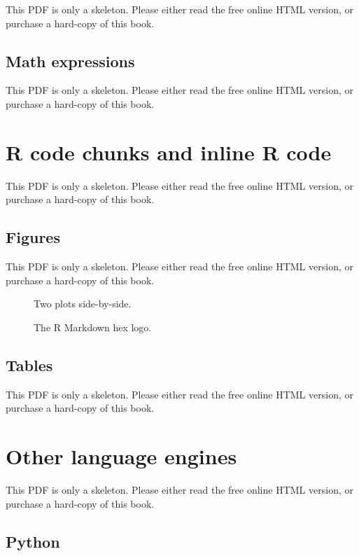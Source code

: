 \documentclass[
  11pt,
]{krantz}
\theoremstyle{definition}
\theoremstyle{definition}
\theoremstyle{definition}
\theoremstyle{definition}
\theoremstyle{remark}
\begin{document}
This PDF is only a skeleton. Please either read the free online HTML version, or purchase a hard-copy of this book.

\subsection{Math expressions}\label{math-expressions}

This PDF is only a skeleton. Please either read the free online HTML version, or purchase a hard-copy of this book.

\section{R code chunks and inline R code}\label{r-code}

This PDF is only a skeleton. Please either read the free online HTML version, or purchase a hard-copy of this book.

\subsection{Figures}\label{figures}

This PDF is only a skeleton. Please either read the free online HTML version, or purchase a hard-copy of this book.

\begin{figure}\caption{Two plots side-by-side.}\end{figure}

\begin{figure}\caption{The R Markdown hex logo.}\end{figure}

\subsection{Tables}\label{tables}

This PDF is only a skeleton. Please either read the free online HTML version, or purchase a hard-copy of this book.

\section{Other language engines}\label{language-engines}

This PDF is only a skeleton. Please either read the free online HTML version, or purchase a hard-copy of this book.

\subsection{Python}\label{python}
\end{document}
